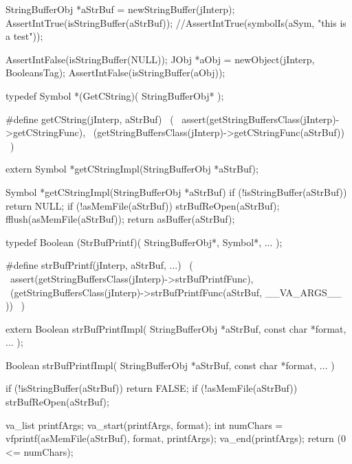 
\startCTest
  StringBufferObj *aStrBuf = newStringBuffer(jInterp);
  AssertIntTrue(isStringBuffer(aStrBuf));
  //AssertIntTrue(symbolIs(aSym, "this is a test"));
\stopCTest
\stopTestCase

\startCTest
  AssertIntFalse(isStringBuffer(NULL));
  JObj *aObj = newObject(jInterp, BooleansTag);
  AssertIntFalse(isStringBuffer(aObj));
\stopCTest
\stopTestCase
\stopTestSuite


\startCHeader
typedef Symbol *(GetCString)(
  StringBufferObj*
);

#define getCString(jInterp, aStrBuf)                          \
  (                                                           \
    assert(getStringBuffersClass(jInterp)->getCStringFunc),   \
    (getStringBuffersClass(jInterp)->getCStringFunc(aStrBuf)) \
  )
\stopCHeader

\setCHeaderStream{private}
\startCHeader
extern Symbol *getCStringImpl(StringBufferObj *aStrBuf);
\stopCHeader
\setCHeaderStream{public}

\startCCode
Symbol *getCStringImpl(StringBufferObj *aStrBuf) {
  if (!isStringBuffer(aStrBuf)) return NULL;
  if (!asMemFile(aStrBuf)) strBufReOpen(aStrBuf);
  fflush(asMemFile(aStrBuf));
  return asBuffer(aStrBuf);
}
\stopCCode

\stopTestSuite

\startTestSuite[strBufPrintf]

\startCHeader
typedef Boolean (StrBufPrintf)(
  StringBufferObj*,
  Symbol*,
  ...
);

#define strBufPrintf(jInterp, aStrBuf, ...)                                   \
  (                                                                           \
    assert(getStringBuffersClass(jInterp)->strBufPrintfFunc),                 \
    (getStringBuffersClass(jInterp)->strBufPrintfFunc(aStrBuf, __VA_ARGS__ )) \
  )
\stopCHeader

\startCHeader
extern Boolean strBufPrintfImpl(
  StringBufferObj   *aStrBuf,
  const char        *format, 
  ...
);
\stopCHeader
\setCHeaderStream{public}

\startCCode
Boolean strBufPrintfImpl(
  StringBufferObj   *aStrBuf,
  const char        *format,
  ...
) {
  if (!isStringBuffer(aStrBuf)) return FALSE;
  if (!asMemFile(aStrBuf)) strBufReOpen(aStrBuf);
  
  va_list printfArgs;
  va_start(printfArgs, format);
  int numChars = vfprintf(asMemFile(aStrBuf), format, printfArgs);
  va_end(printfArgs);
  return (0 <= numChars);
}
\stopCCode


